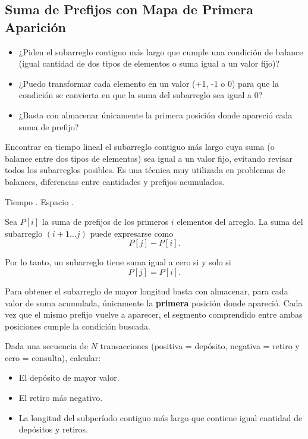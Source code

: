 \subsection{Suma de Prefijos con Mapa de Primera Aparición}


\begin{itemize}
\item ¿Piden el subarreglo contiguo más largo que cumple una condición de balance (igual cantidad de dos tipos de elementos o suma igual a un valor fijo)?
\item ¿Puedo transformar cada elemento en un valor (+1, -1 o 0) para que la condición se convierta en que la suma del subarreglo sea igual a 0?
\item ¿Basta con almacenar únicamente la primera posición donde apareció cada suma de prefijo?
\end{itemize}


Encontrar en tiempo lineal el subarreglo contiguo más largo cuya suma (o balance entre dos tipos de elementos) sea igual a un valor fijo, evitando revisar todos los  subarreglos posibles. Es una técnica muy utilizada en problemas de balances, diferencias entre cantidades y prefijos acumulados.


Tiempo . Espacio .


Sea $P[i]$ la suma de prefijos de los primeros $i$ elementos del arreglo. La suma del subarreglo $(i+1 \dots j)$ puede expresarse como
\[
P[j]-P[i].
\]

Por lo tanto, un subarreglo tiene suma igual a cero si y solo si
\[
P[j]=P[i].
\]

Para obtener el subarreglo de mayor longitud basta con almacenar, para cada valor de suma acumulada, únicamente la \textbf{primera} posición donde apareció. Cada vez que el mismo prefijo vuelve a aparecer, el segmento comprendido entre ambas posiciones cumple la condición buscada.


Dada una secuencia de $N$ transacciones (positiva = depósito, negativa = retiro y cero = consulta), calcular:

\begin{itemize}
\item El depósito de mayor valor.
\item El retiro más negativo.
\item La longitud del subperíodo contiguo más largo que contiene igual cantidad de depósitos y retiros.
\end{itemize}

